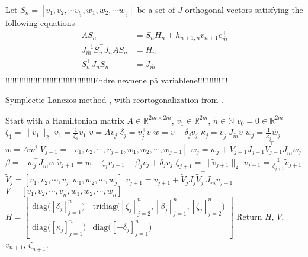 Let $S_n = [v_1,v_2,\cdots v_{\frac{n}{2}},w_1,w_2,\cdots w_{\frac{n}{2}}]$ be a set of $J$-orthogonal vectors satisfying the following equations
\begin{equation}
\begin{aligned}
AS_n &= S_n H_n + h_{n+1,n} v_{n+1} e_{\hat{m}}^\top\\
J_{\hat{m}}^{-1} S_n^\top J_n A S_n &= H_n \\
S_n^{\top} J_n S_n &= J_{\hat{m}}\\
\label{eqn:propS}
\end{aligned}
\end{equation}
!!!!!!!!!!!!!!!!!!!!!!!!!!!!!!!!!!!!!!Endre nevnene på variablene!!!!!!!!!!!!!\\
\begin{algorithm} \caption{Symplectic Lanczos method \cite{SLM}, with reortogonalization from \cite{SLMO}. } \label{alg:symlanz}
\begin{algorithmic}
\STATE Start with a Hamiltonian matrix $A \in \mathbb{R}^{2\tilde{m} \times 2 \tilde{m}}$, $\tilde{v_1} \in \mathbb{R}^{2 \tilde{m}}$, $\tilde{n} \in \mathbb{N}$
\STATE $v_0= 0 \in \mathbb{R}^{2 \tilde{m}}$
\STATE $\zeta_1 = \| \tilde{v}_1\|_2$
\STATE $v_1= \frac{1}{\zeta_1}  \tilde{v}_1$
	\STATE $v = A v_j$
	\STATE $\delta_j =  v_j^\top v$
	\STATE $\tilde{w} = v-\delta_j v_j$
	\STATE $\kappa_j = v_j^\top J_{\tilde{m}} v $
	\STATE $w_j = \frac{1}{\kappa_j} \tilde{w_j}$
	\STATE $w = A w^j$
	\STATE $ \tilde{V}_{j-1} = [v_1,v_2,\cdots,v_{j-1},w_1,w_2,\cdots,w_{j-1}] $
	\STATE $ w_j = w_j + \tilde{V}_{j-1}J_{j-1} \tilde{V}_{j-1}^\top J_{\tilde{m}} w_j $
	\STATE $\beta = -w_j^\top J_{\tilde{m}} w$
	\STATE $\tilde{v}_{j+1} = w - \zeta_j v_{j-1} - \beta_j v_j + \delta_j v_j$
	\STATE $ \zeta_{j+1} = \|\tilde{v}_{j+1} \|_2 $
	\STATE $ v_{j+1} = \frac{1}{\zeta_{j+1}} \tilde{v}_{j+1} $
	\STATE $ \tilde{V}_j = [v_1,v_2,\cdots,v_{j},w_1,w_2,\cdots,w_{j}] $
	\STATE $ v_{j+1} = v_{j+1} + \tilde{V}_j J_j \tilde{V}_j^\top J_{\tilde{m}} v_{j+1} $
\ENDFOR
\STATE $V = [v_1,v_2,\cdots,v_{\tilde{n}},w_1,w_2,\cdots,w_{\tilde{n}}]$
\STATE $H = \begin{bmatrix}
\text{diag} \big( [\delta_j]^n_{j=1} \big) & \text{tridiag}\big( [\zeta_j]_{j=2}^n,[\beta_j]_{j=1}^n,[\zeta_j]_{j=2}^n \big) \\
\text{diag} \big( [\kappa_j]^n_{j=1} \big) & \text{diag} \big( [-\delta_j]^n_{j=1} \big)
\end{bmatrix} $
\STATE Return $H$, $V$, $v_{n+1}$, $\zeta_{n+1}$.
\end{algorithmic}
\end{algorithm}


